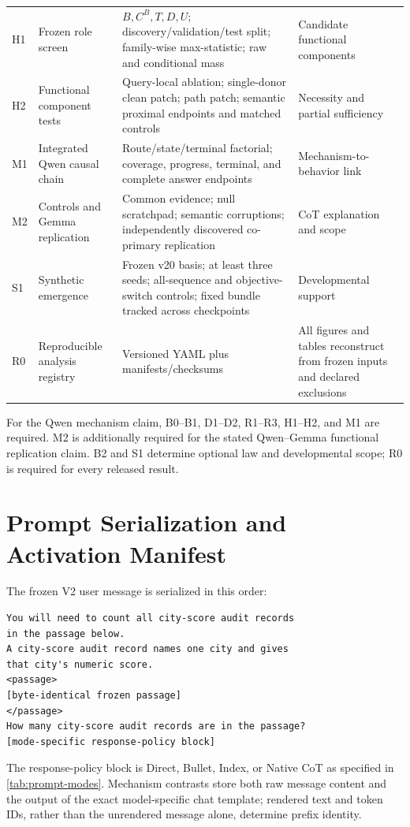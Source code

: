 \begin{table}[H]
\begin{tabularx}{\textwidth}{@{}P{.07\textwidth}P{.19\textwidth}P{.36\textwidth}Y@{}}
H1 & Frozen role screen
  & \(B,C^B,T,D,U\); discovery/validation/test split; family-wise
  max-statistic; raw and conditional mass
  & Candidate functional components \\
H2 & Functional component tests
  & Query-local ablation; single-donor clean patch; path patch; semantic
  proximal endpoints and matched controls
  & Necessity and partial sufficiency \\
M1 & Integrated Qwen causal chain
  & Route/state/terminal factorial; coverage, progress, terminal, and complete
  answer endpoints
  & Mechanism-to-behavior link \\
M2 & Controls and Gemma replication
  & Common evidence; null scratchpad; semantic corruptions; independently
  discovered co-primary replication
  & CoT explanation and scope \\
S1 & Synthetic emergence
  & Frozen v20 basis; at least three seeds; all-sequence and objective-switch
  controls; fixed bundle tracked across checkpoints
  & Developmental support \\
R0 & Reproducible analysis registry
  & Versioned YAML plus manifests/checksums
  & All figures and tables reconstruct from frozen inputs and declared exclusions \\
\bottomrule
\end{tabularx}
\end{table}

For the Qwen mechanism claim, B0--B1, D1--D2, R1--R3, H1--H2, and M1 are
required. M2 is additionally required for the stated Qwen--Gemma functional
replication claim. B2 and S1 determine optional law and developmental scope;
R0 is required for every released result.

\section{Prompt Serialization and Activation Manifest}
\label{app:manifest}

The frozen V2 user message is serialized in this order:
\begin{verbatim}
You will need to count all city-score audit records
in the passage below.
A city-score audit record names one city and gives
that city's numeric score.
<passage>
[byte-identical frozen passage]
</passage>
How many city-score audit records are in the passage?
[mode-specific response-policy block]
\end{verbatim}
The response-policy block is Direct, Bullet, Index, or Native CoT as specified
in \cref{tab:prompt-modes}. Mechanism contrasts store both raw message content
and the output of the exact model-specific chat template; rendered text and
token IDs, rather than the unrendered message alone, determine prefix
identity.

